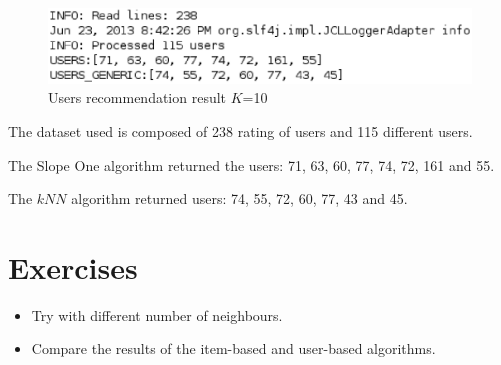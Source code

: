 \documentclass[a4paper,10pt]{article}
\begin{document}
\begin{center}
\begin{figure}[H]
\begin{centering}
\includegraphics[scale=0.55]{userRecommendation.eps}
\par\end{centering}

\caption{Users recommendation result $K$=10}
\end{figure}

\par\end{center}

The dataset used is composed of 238 rating of users and 115 different users.

The Slope One algorithm returned the users: 71, 63, 60, 77,
74, 72, 161 and 55.

The $kNN$ algorithm returned users: 74, 55, 72, 60, 77, 43 and 45.


\section{Exercises}

\begin{itemize}
  \item Try with different number of neighbours.
  \item Compare the results of the item-based and user-based algorithms.
\end{itemize}
\end{document}
